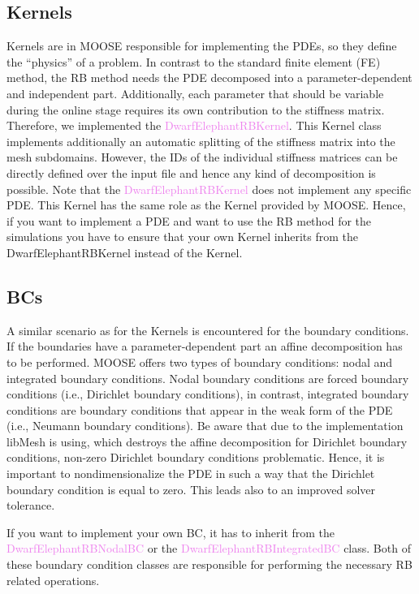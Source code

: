 \documentclass[11pt, a4paper, DIV=14]{scrartcl}
\begin{document}
\subsection{Kernels}
Kernels are in MOOSE responsible for implementing the PDEs, so they define the ``physics'' of a problem.  In contrast to the standard finite element (FE) method, the RB method needs the PDE decomposed into a parameter-dependent and independent part. Additionally, each parameter that should be variable during the online stage requires its own contribution to the stiffness matrix.  Therefore, we implemented the \textcolor{violet}{DwarfElephantRBKernel}. This Kernel class implements additionally an automatic splitting of the stiffness matrix into the mesh subdomains. However, the IDs of the individual stiffness matrices can be directly defined over the input file and hence any kind of decomposition is possible. Note that the  \textcolor{violet}{DwarfElephantRBKernel} does not implement any specific PDE. This Kernel has the same role as the Kernel provided by MOOSE. Hence, if you want to implement a PDE  and want to use the RB method for the simulations you have to ensure that your own Kernel inherits from the DwarfElephantRBKernel instead of the Kernel.

\subsection{BCs}
A similar scenario as for the Kernels is encountered for the boundary conditions. If the boundaries have a parameter-dependent part an affine decomposition has to be performed. MOOSE offers two types of boundary conditions: nodal and integrated boundary conditions. Nodal boundary conditions are forced boundary conditions (i.e., Dirichlet boundary conditions), in contrast, integrated boundary conditions are boundary conditions that appear in the weak form of the PDE (i.e., Neumann boundary conditions). Be aware that due to the implementation libMesh is using, which destroys the affine decomposition for Dirichlet boundary conditions, non-zero Dirichlet boundary conditions problematic. Hence, it is important to nondimensionalize the PDE in such a way that the Dirichlet boundary condition is equal to zero. This leads also to an improved solver tolerance.

If you want to implement your own BC, it has to inherit from the \textcolor{violet}{DwarfElephantRBNodalBC} or the \textcolor{violet}{DwarfElephantRBIntegratedBC} class. Both of these boundary condition classes are responsible for performing the necessary RB related operations.
\end{document}
